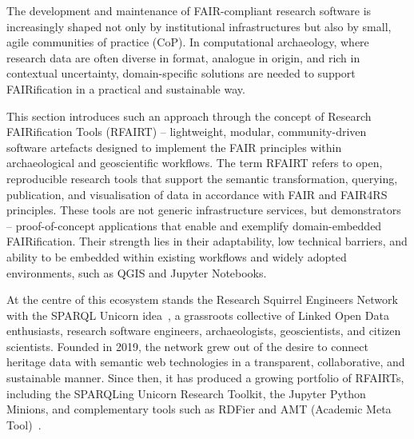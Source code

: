 \documentclass{eceasst}
\begin{document}
The development and maintenance of FAIR-compliant research software is increasingly shaped not only by institutional infrastructures but also by small, agile communities of practice (CoP). In computational archaeology, where research data are often diverse in format, analogue in origin, and rich in contextual uncertainty, domain-specific solutions are needed to support FAIRification in a practical and sustainable way. 

This section introduces such an approach through the concept of Research FAIRification Tools (RFAIRT)  –  lightweight, modular, community-driven software artefacts designed to implement the FAIR principles within archaeological and geoscientific workflows. The term RFAIRT refers to open, reproducible research tools that support the semantic transformation, querying, publication, and visualisation of data in accordance with FAIR and FAIR4RS principles. These tools are not generic infrastructure services, but demonstrators  –  proof-of-concept applications that enable and exemplify domain-embedded FAIRification. Their strength lies in their adaptability, low technical barriers, and ability to be embedded within existing workflows and widely adopted environments, such as QGIS and Jupyter Notebooks. 

At the centre of this ecosystem stands the Research Squirrel Engineers Network with the SPARQL Unicorn idea~\cite{thiery_sparql_2020}, a grassroots collective of Linked Open Data enthusiasts, research software engineers, archaeologists, geoscientists, and citizen scientists. Founded in 2019, the network grew out of the desire to connect heritage data with semantic web technologies in a transparent, collaborative, and sustainable manner. Since then, it has produced a growing portfolio of RFAIRTs, including the SPARQLing Unicorn Research Toolkit, the Jupyter Python Minions, and complementary tools such as RDFier and AMT (Academic Meta Tool)~\cite{unold_academic_2019}. 
\end{document}
